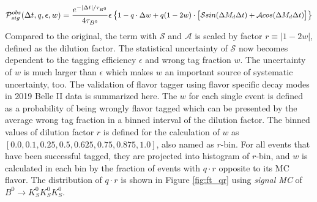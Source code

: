 \begin{equation}\label{eq:tdcpv_all_ft}
\small
\mathcal{P}_{sig}^{obs}(\Delta t, q, \epsilon, w) = 
\frac{e^{-|\Delta t|/\tau_{B^0}}}{4\tau_{B^0}}
\epsilon
\begin{Bmatrix}
1 - q\cdot \Delta w+ q(1-2w)\cdot 
\begin{bmatrix}
\mathcal{S}sin(\Delta M_d \Delta t) + 
\mathcal{A}cos(\Delta M_d \Delta t)
\end{bmatrix}
\end{Bmatrix}
\end{equation} 
Compared to the original, the term with $\mathcal{S}$ and $\mathcal{A}$ is scaled by factor $r\equiv |1-2w|$, defined as the dilution factor. The statistical uncertainty of $\mathcal{S}$ now becomes dependent to the tagging efficiency $\epsilon$ and wrong tag fraction $w$. The uncertainty of $w$ is much larger than $\epsilon$ which makes $w$ an important source of systematic uncertainty, too. The validation of flavor tagger using flavor specific decay modes in 2019 Belle II data is summarized here\cite{abudinen2020first}. The $w$ for each single event is defined as a probability of being wrongly flavor tagged which can be presented by the average wrong tag fraction in a binned interval of the dilution factor. The binned values of dilution factor $r$ is defined for the calculation of $w$ as $[0.0, 0.1, 0.25, 0.5, 0.625, 0.75, 0.875, 1.0]$, also named as $r$-bin. For all events that have been successful tagged, they are projected into histogram of $r$-bin, and $w$ is calculated in each bin by the fraction of events with $q\cdot r$ opposite to its MC flavor. The distribution of $q\cdot r$ is shown in Figure \ref{fig:ft_qr} using \textit{signal MC} of $B^0 \to K_S^0  K_S^0  K_S^0$. 

